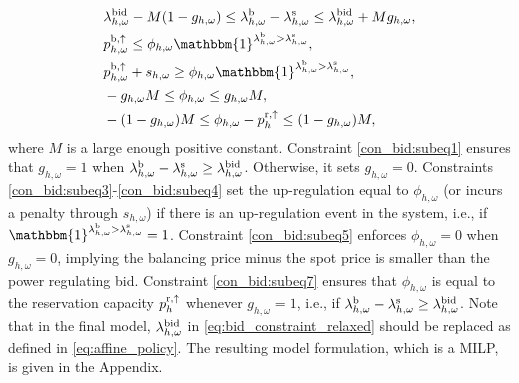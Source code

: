 \begin{subequations}\label{eq:bid_constraint_relaxed}
    \begin{align}
       & \lambda_{h,\omega}^{\rm{bid}} - M  (1 - g_{h,\omega}) \leq \lambda_{h,\omega}^{\rm{b}} - \lambda_{h,\omega}^{\rm{s}} \leq \lambda_{h,\omega}^{\rm{bid}} + M  g_{h,\omega},                               \label{con_bid:subeq1}\\
        & p^{\rm{b}, \uparrow}_{h,\omega} \leq \phi_{h,\omega}  \mathbbm{1}^{\lambda^{\rm{b}}_{h,\omega} > \lambda^{\rm{s}}_{h,\omega}}, \                          \label{con_bid:subeq3}  \\
        &p^{\rm{b}, \uparrow}_{h,\omega} + s_{h,\omega} \geq \phi_{h,\omega}  \mathbbm{1}^{\lambda^{\rm{b}}_{h,\omega} > \lambda^{\rm{s}}_{h,\omega}}, \            \label{con_bid:subeq4}  \\
        &-g_{h,\omega}  M \leq \phi_{h,\omega} \leq g_{h,\omega}  M,                                   \label{con_bid:subeq5}  \\
        &-(1 - g_{h,\omega})  M \leq \phi_{h,\omega} - p^{\rm{r},\uparrow}_{h} \leq (1 - g_{h,\omega}) M, \                                                                                    \label{con_bid:subeq7}  \
    \end{align}
\end{subequations}
where $M$ is a large enough positive constant.
Constraint \eqref{con_bid:subeq1} ensures that $g_{h,\omega} = 1$ when $\lambda_{h,\omega}^{\rm{b}} - \lambda_{h,\omega}^{\rm{s}} \geq \lambda^{\rm{bid}}_{h, \omega}$. Otherwise, it sets $g_{h,\omega} = 0$. Constraints \eqref{con_bid:subeq3}-\eqref{con_bid:subeq4} set the up-regulation equal to $\phi_{h,\omega}$ (or incurs a penalty through $s_{h,\omega}$) if there is an up-regulation event in the system, i.e., if $\mathbbm{1}^{\lambda^{\rm{b}}_{h,\omega} > \lambda^{\rm{s}}_{h,\omega}} = 1$. Constraint \eqref{con_bid:subeq5} enforces  $\phi_{h,\omega} = 0$ when $g_{h,\omega} = 0$, implying the balancing price minus the spot price is smaller than the power regulating bid. Constraint \eqref{con_bid:subeq7} ensures that $\phi_{h,\omega}$ is equal to the reservation capacity $p^{\rm{r},\uparrow}_{h}$ whenever $g_{h,\omega} = 1$, i.e., if $\lambda_{h,\omega}^{\rm{b}} - \lambda_{h,\omega}^{\rm{s}} \geq \lambda^{\rm{bid}}_{h, \omega}$. Note that in the final model,  $\lambda^{\rm{bid}}_{h, \omega}$ in \eqref{eq:bid_constraint_relaxed} should be replaced as defined in \eqref{eq:affine_policy}. The resulting model formulation, which is a MILP, is given in the Appendix.

